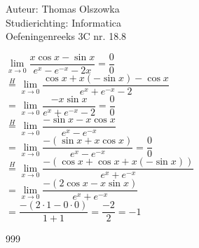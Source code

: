 \documentclass[a4paper]{article}
\newcommand{\llim}{\lim\limits}
\begin{document}
\noindent \large Auteur: Thomas Olszowka \\
\noindent \large Studierichting: Informatica\\
\noindent \large Oefeningenreeks 3C nr. 18.8\\

\medskip

\normalsize

$\llim_{x\rightarrow 0} \dfrac{x \cos x - \sin x}{e^x - e^{-x} -2x} = \dfrac{0}{0}$\\

$\overset{H}{=}\llim_{x \rightarrow 0} \dfrac{\cos x + x(-\sin x) - \cos x}{e^x + e^{-x} -2}$\\

$= \llim_{x \rightarrow 0} \dfrac{-x\sin x}{e^x + e^{-x} -2} = \dfrac{0}{0}$\\  

$\overset{H}{=}\llim_{x \rightarrow 0} \dfrac{-\sin x -x\cos x}{e^x - e^{-x}}$\\

$= \llim_{x \rightarrow 0} \dfrac{-(\sin x + x\cos x)}{e^x - e^{-x}} = \dfrac{0}{0}$\\

$\overset{H}{=}\llim_{x \rightarrow 0} \dfrac{-(\cos x + \cos x + x(-\sin x))}{e^x + e^{-x}}$\\

$= \llim_{x \rightarrow 0} \dfrac{-(2\cos x - x\sin x)}{e^x + e^{-x}}$\\

$= \dfrac{-(2 \cdot 1 -0 \cdot 0)}{1 + 1} =\dfrac{-2}{2} = -1$

\begin{thebibliography}{999}
\end{thebibliography}
\end{document}
